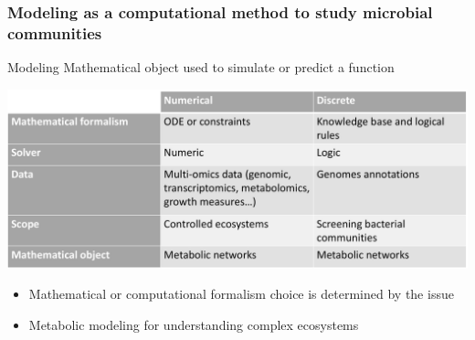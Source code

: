 \documentclass[8pt,usenames,dvipsnames]{beamer}
\begin{document}
\begin{frame}
\frametitle{Modeling as a computational method to study microbial communities}
\begin{exampleblock}{Modeling}
Mathematical object used to simulate or predict a function
\end{exampleblock}

\includegraphics[width=\textwidth]{figures/modeling.pdf}

\begin{alertblock}{}
\centering
\begin{itemize}
\item Mathematical or computational formalism choice is determined by the issue
\item Metabolic modeling for understanding complex ecosystems
\end{itemize}

\end{alertblock}
\end{frame}
\end{document}
